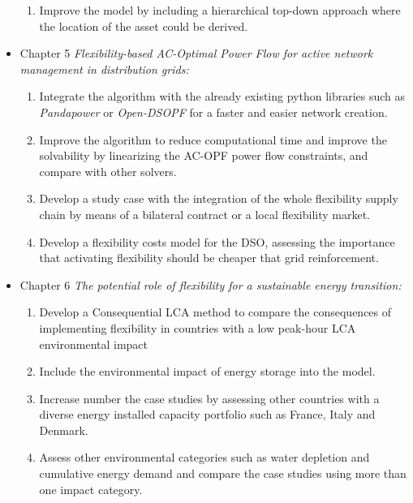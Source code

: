 \begin{itemize}
\begin{enumerate}
		\item Improve the model by including a hierarchical top-down approach where the location of the asset could be derived. 
	\end{enumerate}
\item Chapter 5 \textit{Flexibility-based AC-Optimal Power Flow for active network management in distribution grids:} 
	\begin{enumerate}
		\item Integrate the algorithm with the already existing python libraries such as \textit{Pandapower} or \textit{Open-DSOPF} for a faster and easier network creation. 
		\item Improve the algorithm to reduce computational time and improve the solvability by linearizing the AC-OPF power flow constraints, and compare with other solvers. 
		\item Develop a study case with the integration of the whole flexibility supply chain by means of a bilateral contract or a local flexibility market. 
		\item Develop a flexibility costs model for the DSO, assessing the importance that activating flexibility should be cheaper that grid reinforcement. 
	\end{enumerate}
\item Chapter 6 \textit{The potential role of flexibility for a sustainable energy transition:} 
	\begin{enumerate}
		\item Develop a Consequential LCA method to compare the consequences of implementing flexibility in countries with a low peak-hour LCA environmental impact
		\item Include the environmental impact of energy storage into the model. 
		\item Increase number the case studies by assessing other countries with a diverse energy installed capacity portfolio such as France, Italy and Denmark. 
		\item Assess other environmental categories such as water depletion and cumulative energy demand and compare the case studies using more than one impact category. 
	\end{enumerate}
\end{itemize}
